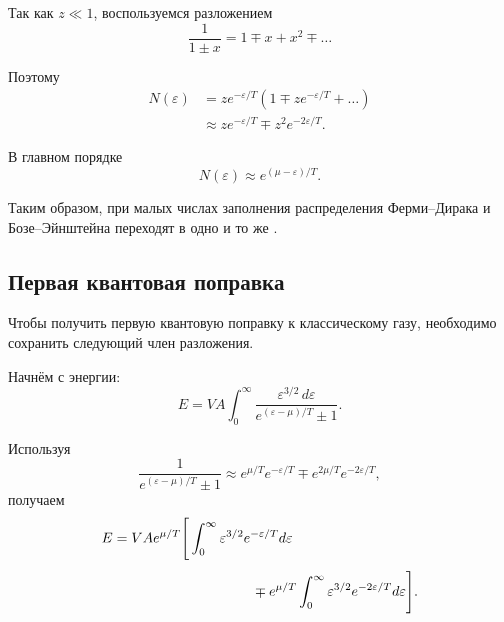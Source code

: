 \documentclass[../final.tex]{subfiles}
\begin{document}
Так как $z\ll1$, воспользуемся разложением
%
\begin{equation*}
    \frac{1}{1\pm x}
    =
    1
    \mp
    x
    +
    x^2
    \mp
    \ldots
\end{equation*}

Поэтому
%
\begin{align*}
    N(\varepsilon)
    &=
    ze^{-\varepsilon/T}
    \left(
        1
        \mp
        ze^{-\varepsilon/T}
        +
        \ldots
    \right)
    \\[4pt]
    &\approx
    ze^{-\varepsilon/T}
    \mp
    z^2e^{-2\varepsilon/T}.
\end{align*}

В главном порядке
%
\[
    \boxed{
        N(\varepsilon)
        \approx
        e^{(\mu-\varepsilon)/T}
    }.
\]

Таким образом, при малых числах заполнения распределения
Ферми--Дирака и Бозе--Эйнштейна переходят в одно и то же
.


\subsection{Первая квантовая поправка}

Чтобы получить первую квантовую поправку к классическому газу,
необходимо сохранить следующий член разложения.

Начнём с энергии:
%
\begin{equation*}
    E
    =
    VA
    \int_0^\infty
    \frac{
        \varepsilon^{3/2}\,
        d\varepsilon
    }{
        e^{(\varepsilon-\mu)/T}\pm1
    }.
\end{equation*}

Используя
%
\begin{equation*}
    \frac{1}{
        e^{(\varepsilon-\mu)/T}\pm1
    }
    \approx
    e^{\mu/T}e^{-\varepsilon/T}
    \mp
    e^{2\mu/T}e^{-2\varepsilon/T},
\end{equation*}
%
получаем
%
\begin{align*}
    E
    &=
    VAe^{\mu/T}
    \Bigg[
        \int_0^\infty
        \varepsilon^{3/2}
        e^{-\varepsilon/T}
        d\varepsilon
        \\[4pt]
        &\hspace{3.5cm}
        \mp
        e^{\mu/T}
        \int_0^\infty
        \varepsilon^{3/2}
        e^{-2\varepsilon/T}
        d\varepsilon
    \Bigg].
\end{align*}
\end{document}
